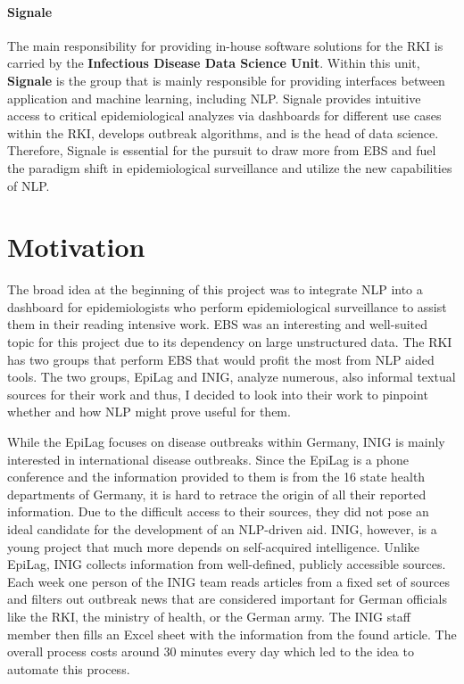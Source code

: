\paragraph{Signale}
  The main responsibility for providing in-house software solutions for the RKI is carried by the \textbf{Infectious Disease Data Science Unit}.
  Within this unit, \textbf{Signale} is the group that is mainly responsible for providing interfaces between application and machine learning, including NLP.
  Signale provides intuitive access to critical epidemiological analyzes via dashboards for different use cases within the RKI, develops outbreak algorithms, and is the head of data science.
  Therefore, Signale is essential for the pursuit to draw more from EBS and fuel the paradigm shift in epidemiological surveillance and utilize the new capabilities of NLP.


\section{Motivation}
  The broad idea at the beginning of this project was to integrate NLP into a dashboard for epidemiologists who perform epidemiological surveillance to assist them in their reading intensive work.
  EBS was an interesting and well-suited topic for this project due to its dependency on large unstructured data.
  The RKI has two groups that perform EBS that would profit the most from NLP aided tools. The two groups, EpiLag and INIG, analyze numerous, also informal textual sources for their work and thus, I decided to look into their work to pinpoint whether and how NLP might prove useful for them.

  While the EpiLag focuses on disease outbreaks within Germany, INIG is mainly interested in international disease outbreaks. Since the EpiLag is a phone conference and the information provided to them is from the 16 state health departments of Germany, it is hard to retrace the origin of all their reported information.
  Due to the difficult access to their sources, they did not pose an ideal candidate for the development of an NLP-driven aid.
  INIG, however, is a young project that much more depends on self-acquired intelligence.
  Unlike EpiLag, INIG collects information from well-defined, publicly accessible sources.
  Each week one person of the INIG team reads articles from a fixed set of sources and filters out outbreak news that are considered important for German officials like the RKI, the ministry of health, or the German army.
  The INIG staff member then fills an Excel sheet with the information from the found article.
  The overall process costs around 30 minutes every day which led to the idea to automate this process.

